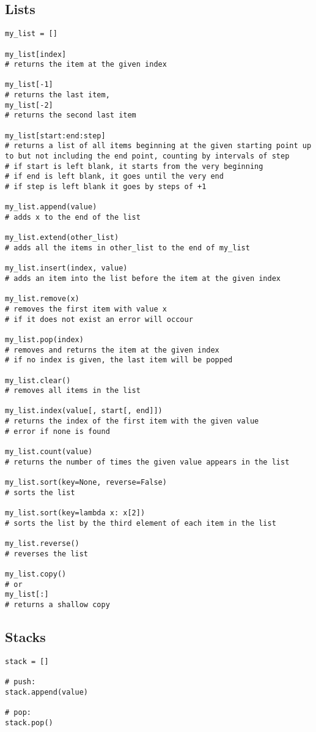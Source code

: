 \documentclass[12pt]{article}
\begin{document}
\subsection{Lists}
\begin{lstlisting}
my_list = []

my_list[index]
# returns the item at the given index

my_list[-1]
# returns the last item,
my_list[-2]
# returns the second last item

my_list[start:end:step]
# returns a list of all items beginning at the given starting point up to but not including the end point, counting by intervals of step
# if start is left blank, it starts from the very beginning
# if end is left blank, it goes until the very end
# if step is left blank it goes by steps of +1

my_list.append(value)
# adds x to the end of the list

my_list.extend(other_list)
# adds all the items in other_list to the end of my_list

my_list.insert(index, value)
# adds an item into the list before the item at the given index

my_list.remove(x)
# removes the first item with value x
# if it does not exist an error will occour

my_list.pop(index)
# removes and returns the item at the given index
# if no index is given, the last item will be popped

my_list.clear()
# removes all items in the list

my_list.index(value[, start[, end]])
# returns the index of the first item with the given value
# error if none is found

my_list.count(value)
# returns the number of times the given value appears in the list

my_list.sort(key=None, reverse=False)
# sorts the list

my_list.sort(key=lambda x: x[2])
# sorts the list by the third element of each item in the list

my_list.reverse()
# reverses the list

my_list.copy()
# or
my_list[:]
# returns a shallow copy
\end{lstlisting}

\subsection{Stacks}
\begin{lstlisting}
stack = []

# push:
stack.append(value)

# pop:
stack.pop()
\end{lstlisting}
\end{document}
